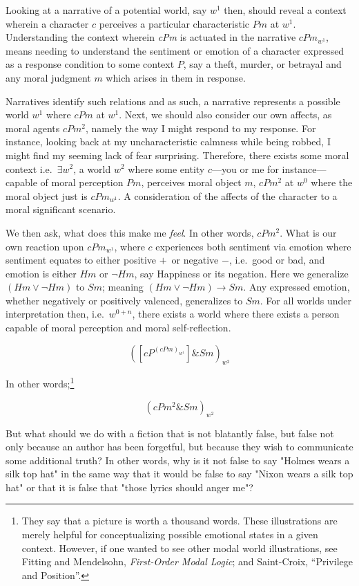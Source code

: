 \documentclass[phdthesis,12pt,final,a4paper]{wuthesis}
\theoremstyle{definition}
\theoremstyle{definition}
\theoremstyle{definition}
\theoremstyle{definition}
\theoremstyle{remark}
\begin{document}
Looking at a narrative of a potential world, say \emph{\(w^1\)} then, should reveal a context wherein a character \(c\) perceives a particular characteristic \(Pm\) at \emph{\(w^1\)}. Understanding the context wherein \emph{cPm} is actuated in the narrative \(cPm_{w^{1}}\), means needing to understand the sentiment or emotion of a character expressed as a response condition to some context \(P\), say a theft, murder, or betrayal and any moral judgment \(m\) which arises in them in response.

Narratives identify such relations and as such, a narrative represents a possible world \(w^1\) where \(cPm\) at \(w^1\). Next, we should also consider our own affects, as moral agents \(cPm^{2}\), namely the way I might respond to my response. For instance, looking back at my uncharacteristic calmness while being robbed, I might find my seeming lack of fear surprising. Therefore, there exists some moral context i.e.~\(\exists w^2\), a world \(w^2\) where some entity \(c\)---you or me for instance---capable of moral perception \(Pm\), perceives moral object \(m\), \(cPm^{2}\) at \(w^0\) where the moral object just is \(cPm_{w^{1}}\). A consideration of the affects of the character to a moral significant scenario.

We then ask, what does this make me \emph{feel}. In other words, \(cPm^{2}\). What is our own reaction upon \(cPm_{w^1}\), where \(c\) experiences both sentiment via emotion where sentiment equates to either positive \(+\)~or negative \(-\), i.e.~good or bad, and emotion is either \(Hm\) or \(\neg Hm\), say Happiness or its negation. Here we generalize \(( Hm  \lor \neg  Hm)\) to \(Sm\); meaning \(( Hm \lor \neg Hm ) \rightarrow Sm\). Any expressed emotion, whether negatively or positively valenced, generalizes to \(Sm\). For all worlds under interpretation then, i.e.~\(w^{0+n}\), there exists a world where there exists a person capable of moral perception and moral self-reflection.

\[([cP^{( cPm )_{w^{1}}}] \& Sm)_{w^{2}}\]

In other words;\footnote{They say that a picture is worth a thousand words. These illustrations are merely helpful for conceptualizing possible emotional states in a given context. However, if one wanted to see other modal world illustrations, see Fitting and Mendelsohn, \emph{First-{Order Modal Logic}}; and Saint-Croix, {``Privilege and {Position}''}.}

\[( cPm^{2} \& Sm )_{w^{2}}\]

But what should we do with a fiction that is not blatantly false, but false not only because an author has been forgetful, but because they wish to communicate some additional truth? In other words, why is it not false to say "Holmes wears a silk top hat" in the same way that it would be false to say "Nixon wears a silk top hat" or that it is false that "those lyrics should anger me"?
\end{document}
